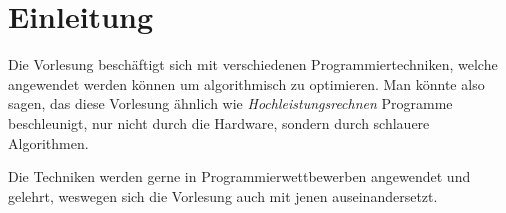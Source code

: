 \section*{Einleitung}
Die Vorlesung beschäftigt sich mit verschiedenen Programmiertechniken, welche angewendet werden können um algorithmisch zu optimieren.
Man könnte also sagen, das diese Vorlesung ähnlich wie \emph{Hochleistungsrechnen} Programme beschleunigt, nur nicht durch die Hardware, sondern durch schlauere Algorithmen.

Die Techniken werden gerne in Programmierwettbewerben angewendet und gelehrt, weswegen sich die Vorlesung auch mit jenen auseinandersetzt.
